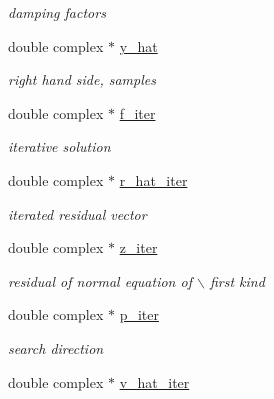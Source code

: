 \begin{CompactItemize}
\begin{CompactList}\small\item\em damping factors \item\end{CompactList}\item 
\hypertarget{structimri__inh__3d__adjoint__plan_o4}{
double complex $\ast$ \hyperlink{structimri__inh__3d__adjoint__plan_o4}{y\_\-hat}}
\label{structimri__inh__3d__adjoint__plan_o4}

\begin{CompactList}\small\item\em right hand side, samples \item\end{CompactList}\item 
\hypertarget{structimri__inh__3d__adjoint__plan_o5}{
double complex $\ast$ \hyperlink{structimri__inh__3d__adjoint__plan_o5}{f\_\-iter}}
\label{structimri__inh__3d__adjoint__plan_o5}

\begin{CompactList}\small\item\em iterative solution \item\end{CompactList}\item 
\hypertarget{structimri__inh__3d__adjoint__plan_o6}{
double complex $\ast$ \hyperlink{structimri__inh__3d__adjoint__plan_o6}{r\_\-hat\_\-iter}}
\label{structimri__inh__3d__adjoint__plan_o6}

\begin{CompactList}\small\item\em iterated residual vector \item\end{CompactList}\item 
\hypertarget{structimri__inh__3d__adjoint__plan_o7}{
double complex $\ast$ \hyperlink{structimri__inh__3d__adjoint__plan_o7}{z\_\-iter}}
\label{structimri__inh__3d__adjoint__plan_o7}

\begin{CompactList}\small\item\em residual of normal equation of $\backslash$ first kind \item\end{CompactList}\item 
\hypertarget{structimri__inh__3d__adjoint__plan_o8}{
double complex $\ast$ \hyperlink{structimri__inh__3d__adjoint__plan_o8}{p\_\-iter}}
\label{structimri__inh__3d__adjoint__plan_o8}

\begin{CompactList}\small\item\em search direction \item\end{CompactList}\item 
\hypertarget{structimri__inh__3d__adjoint__plan_o9}{
double complex $\ast$ \hyperlink{structimri__inh__3d__adjoint__plan_o9}{v\_\-hat\_\-iter}}
\label{structimri__inh__3d__adjoint__plan_o9}


\end{CompactItemize}
